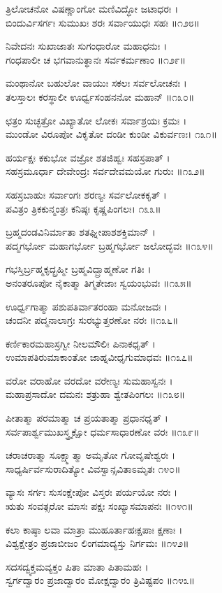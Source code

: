 ತ್ರಿಲೋಚನೋ ವಿಷಣ್ಣಾಂಗೋ ಮಣಿವಿದ್ಧೋ ಜಟಾಧರಃ ।\\
ಬಿಂದುರ್ವಿಸರ್ಗಃ ಸುಮುಖಃ ಶರಃ ಸರ್ವಾಯುಧಃ ಸಹಃ ॥೧೨೮॥

ನಿವೇದನಃ ಸುಖಾಜಾತಃ ಸುಗಂಧಾರೋ ಮಹಾಧನುಃ ।\\
ಗಂಧಪಾಲೀ ಚ ಭಗವಾನುತ್ಥಾನಃ ಸರ್ವಕರ್ಮಣಾಂ ॥೧೨೯॥

ಮಂಥಾನೋ ಬಹುಲೋ ವಾಯುಃ ಸಕಲಃ ಸರ್ವಲೋಚನಃ ।\\
ತಲಸ್ತಾಲಃ ಕರಸ್ಥಾಲೀ ಊರ್ಧ್ವಸಂಹನನೋ ಮಹಾನ್ ॥೧೩೦॥

ಛತ್ರಂ ಸುಚ್ಛತ್ರೋ ವಿಖ್ಯಾತೋ ಲೋಕಃ ಸರ್ವಾಶ್ರಯಃ ಕ್ರಮಃ ।\\
ಮುಂಡೋ ವಿರೂಪೋ ವಿಕೃತೋ ದಂಡೀ ಕುಂಡೀ ವಿಕುರ್ವಣಃ। ೧೩೧॥

ಹರ್ಯಕ್ಷಃ ಕಕುಭೋ ವಜ್ರೋ ಶತಜಿಹ್ವಃ ಸಹಸ್ರಪಾತ್ ।\\
ಸಹಸ್ರಮೂರ್ಧಾ ದೇವೇಂದ್ರಃ ಸರ್ವದೇವಮಯೋ ಗುರುಃ ॥೧೩೨॥

ಸಹಸ್ರಬಾಹುಃ ಸರ್ವಾಂಗಃ ಶರಣ್ಯಃ ಸರ್ವಲೋಕಕೃತ್ ।\\
ಪವಿತ್ರಂ ತ್ರಿಕಕುನ್ಮಂತ್ರಃ ಕನಿಷ್ಠಃ ಕೃಷ್ಣಪಿಂಗಲಃ। ೧೩೩॥

ಬ್ರಹ್ಮದಂಡವಿನಿರ್ಮಾತಾ ಶತಘ್ನೀಪಾಶಶಕ್ತಿಮಾನ್ ।\\
ಪದ್ಮಗರ್ಭೋ ಮಹಾಗರ್ಭೋ ಬ್ರಹ್ಮಗರ್ಭೋ ಜಲೋದ್ಭವಃ ॥೧೩೪॥

ಗಭಸ್ತಿರ್ಬ್ರಹ್ಮಕೃದ್ಬ್ರಹ್ಮೀ ಬ್ರಹ್ಮವಿದ್ಬ್ರಾಹ್ಮಣೋ ಗತಿಃ ।\\
ಅನಂತರೂಪೋ ನೈಕಾತ್ಮಾ ತಿಗ್ಮತೇಜಾಃ ಸ್ವಯಂಭುವಃ ॥೧೩೫॥

ಊರ್ಧ್ವಗಾತ್ಮಾ ಪಶುಪತಿರ್ವಾತರಂಹಾ ಮನೋಜವಃ ।\\
ಚಂದನೀ ಪದ್ಮನಾಲಾಗ್ರಃ ಸುರಭ್ಯುತ್ತರಣೋ ನರಃ ॥೧೩೬॥

ಕರ್ಣಿಕಾರಮಹಾಸ್ರಗ್ವೀ ನೀಲಮೌಲಿಃ ಪಿನಾಕಧೃತ್ ।\\
ಉಮಾಪತಿರುಮಾಕಾಂತೋ ಜಾಹ್ನವೀಧೃಗುಮಾಧವಃ ॥೧೩೭॥

ವರೋ ವರಾಹೋ ವರದೋ ವರೇಣ್ಯಃ ಸುಮಹಾಸ್ವನಃ ।\\
ಮಹಾಪ್ರಸಾದೋ ದಮನಃ ಶತ್ರುಹಾ ಶ್ವೇತಪಿಂಗಲಃ ॥೧೩೮॥

ಪೀತಾತ್ಮಾ ಪರಮಾತ್ಮಾ ಚ ಪ್ರಯತಾತ್ಮಾ ಪ್ರಧಾನಧೃತ್ ।\\
ಸರ್ವಪಾರ್ಶ್ವಮುಖಸ್ತ್ರ್ಯಕ್ಷೋ ಧರ್ಮಸಾಧಾರಣೋ ವರಃ ॥೧೩೯॥

ಚರಾಚರಾತ್ಮಾ ಸೂಕ್ಷ್ಮಾತ್ಮಾ ಅಮೃತೋ ಗೋವೃಷೇಶ್ವರಃ ।\\
ಸಾಧ್ಯರ್ಷಿರ್ವಸುರಾದಿತ್ಯೋ ವಿವಸ್ವಾನ್ಸವಿತಾಽಮೃತಃ ೧೪೦॥

ವ್ಯಾಸಃ ಸರ್ಗಃ ಸುಸಂಕ್ಷೇಪೋ ವಿಸ್ತರಃ ಪರ್ಯಯೋ ನರಃ ।\\
ಋತು ಸಂವತ್ಸರೋ ಮಾಸಃ ಪಕ್ಷಃ ಸಂಖ್ಯಾಸಮಾಪನಃ ॥೧೪೧॥

ಕಲಾ ಕಾಷ್ಠಾ ಲವಾ ಮಾತ್ರಾ ಮುಹೂರ್ತಾಹಃಕ್ಷಪಾಃ ಕ್ಷಣಾಃ ।\\
ವಿಶ್ವಕ್ಷೇತ್ರಂ ಪ್ರಜಾಬೀಜಂ ಲಿಂಗಮಾದ್ಯಸ್ತು ನಿರ್ಗಮಃ ॥೧೪೨॥

ಸದಸದ್ವ್ಯಕ್ತಮವ್ಯಕ್ತಂ ಪಿತಾ ಮಾತಾ ಪಿತಾಮಹಃ ।\\
ಸ್ವರ್ಗದ್ವಾರಂ ಪ್ರಜಾದ್ವಾರಂ ಮೋಕ್ಷದ್ವಾರಂ ತ್ರಿವಿಷ್ಟಪಂ ॥೧೪೩॥

